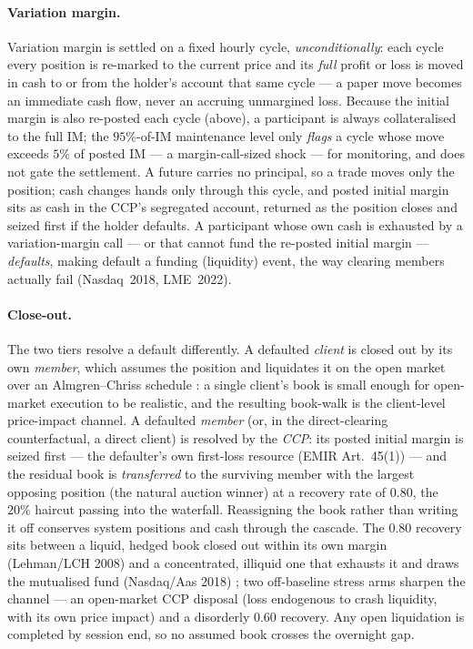 \paragraph{Variation margin.}
Variation margin is settled on a fixed hourly cycle, \emph{unconditionally}: each cycle every position
is re-marked to the current price and its \emph{full} profit or loss is moved in cash to or from the
holder's account that same cycle --- a paper move becomes an immediate cash flow, never an accruing
unmargined loss. Because the initial margin is also re-posted each cycle (above), a participant is
always collateralised to the full IM; the $95\%$-of-IM maintenance level only \emph{flags} a cycle
whose move exceeds $5\%$ of posted IM --- a margin-call-sized shock --- for monitoring, and does not
gate the settlement. A future carries no principal, so a trade moves only the position; cash changes
hands only through this cycle, and posted initial margin sits as cash in the CCP's segregated account,
returned as the position closes and seized first if the holder defaults. A participant whose own cash
is exhausted by a variation-margin call --- or that cannot fund the re-posted initial margin ---
\emph{defaults}, making default a funding (liquidity) event, the way clearing members actually fail
(Nasdaq~2018, LME~2022).



\paragraph{Close-out.}
The two tiers resolve a default differently. A defaulted \emph{client} is closed out by its own
\emph{member}, which assumes the position and liquidates it on the open market over an Almgren--Chriss
schedule \citep{almgren_chriss_2000}: a single client's book is small enough for open-market execution
to be realistic, and the resulting book-walk is the client-level price-impact channel. A defaulted
\emph{member} (or, in the direct-clearing counterfactual, a direct client) is resolved by the
\emph{CCP}: its posted initial margin is seized first --- the defaulter's own first-loss resource
(EMIR Art.~45(1)) --- and the residual book is \emph{transferred} to the surviving member with the
largest opposing position (the natural auction winner) at a recovery rate of $0.80$, the $20\%$
haircut passing into the waterfall. Reassigning the book rather than writing it off conserves system
positions and cash through the cascade. The $0.80$ recovery sits between a liquid, hedged book closed
out within its own margin (Lehman/LCH 2008) and a concentrated, illiquid one that exhausts it and
draws the mutualised fund (Nasdaq/Aas 2018) \citep{bell_holden_2018,vuillemey_2020}; two off-baseline
stress arms sharpen the channel --- an open-market CCP disposal (loss endogenous to crash liquidity,
with its own price impact) and a disorderly $0.60$ recovery. Any open liquidation is completed by
session end, so no assumed book crosses the overnight gap.

